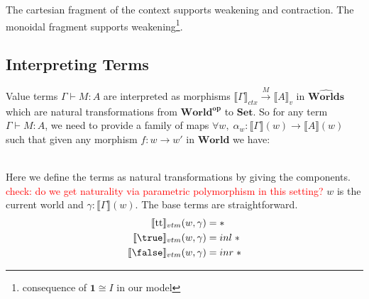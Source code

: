 \documentclass{article}
\newcommand{\red}[1]{\textcolor{red}{#1}}
\newcommand{\ttt}{\textrm{tt}}
\newcommand{\worlds}{\widehat{\mathbf{Worlds}}}
\begin{document}
The cartesian fragment of the context supports weakening and contraction. The monoidal fragment supports weakening\footnote{consequence of $\mathbf{1} \cong I$ in our model}.


\subsection{Interpreting Terms}
Value terms $\Gamma \vdash M : A$ are interpreted as morphisms $\llbracket \Gamma \rrbracket_{ctx} \xrightarrow{M} \llbracket A \rrbracket_{v}$ in $\worlds$ which are natural transformations from $\mathbf{World^{op}}$ to $\mathbf{Set}$. So for any term $\Gamma \vdash M : A$, we need to provide a family of maps $\forall w ,\; \alpha_w : \llbracket \Gamma \rrbracket(w) \rightarrow \llbracket A \rrbracket(w)$ such that given any morphism $f : w \rightarrow w'$ in $\mathbf{World}$ we have:
\begin{figure}[!ht]
    \centering

\end{figure}\\
Here we define the terms as natural transformations by giving the components. \red{check: do we get naturality via parametric polymorphism in this setting?} $w$ is the current world and $\gamma : \llbracket \Gamma \rrbracket(w)$. The base terms are straightforward. 
\begin{align*}
    \llbracket  \ttt \rrbracket_{vtm}(w, \gamma) &= *\\
    \llbracket  \true \rrbracket_{vtm}(w,\gamma) &= inl \;*\\
    \llbracket  \false \rrbracket_{vtm}(w,\gamma) &= inr \;*\\
\end{align*}
\end{document}
